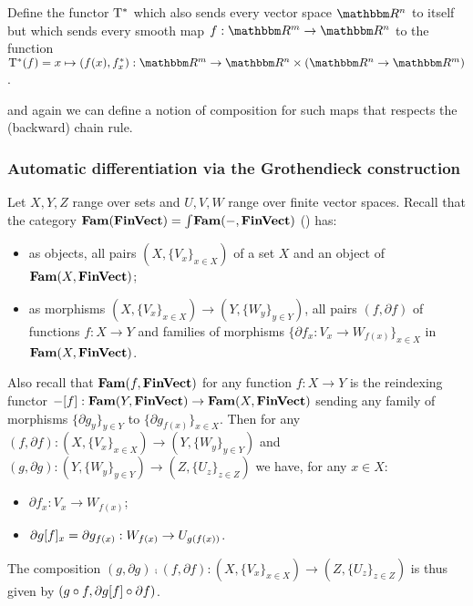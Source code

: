\begin{definition}
Define the functor $\mathrm{T}^*$ which also sends every vector space $\RR^n$ to itself but which sends every
smooth map $f: \RR^m \to \RR^n$ to the function $\tangents^*(f) = x \mapsto (f(x), \pullf{f}_x): \RR^m \to
\RR^n \times (\RR^n \to \RR^m)$.
\end{definition}

\noindent and again we can define a notion of composition for such maps that respects the (backward) chain
rule.

\subsubsection{Automatic differentiation via the Grothendieck construction}

Let $X, Y, Z$ range over sets and $U, V, W$ range over finite vector spaces. Recall that the category
$\mathbf{Fam}(\mathbf{FinVect}) = \int_{}\mathbf{Fam}(-, \mathbf{FinVect})$ () has:
\begin{itemize}
\item as objects, all pairs $(X, \{V_x\}_{x \in X})$ of a set $X$ and an object of $\mathbf{Fam}(X,\mathbf{FinVect})$;
\item as morphisms $(X, \{V_x\}_{x \in X}) \to (Y, \{W_y\}_{y \in Y})$, all pairs $(f, \partial f)$ of
functions $f: X \to Y$ and families of morphisms $\{\partial f_x: V_x \to W_{f(x)}\}_{x \in X}$
in $\mathbf{Fam}(X,\mathbf{FinVect})$.
\end{itemize}

Also recall that $\mathbf{Fam}(f, \mathbf{FinVect})$ for any function $f: X \to Y$ is the reindexing functor $-[f]:
\mathbf{Fam}(Y, \mathbf{FinVect}) \to \mathbf{Fam}(X, \mathbf{FinVect})$ sending any family of morphisms $\{\partial g_y\}_{y \in Y}$ to
$\{\partial g_{f(x)}\}_{x \in X}$. Then for any $(f, \partial f): (X, \{V_x\}_{x \in X}) \to (Y, \{W_y\}_{y
\in Y})$ and $(g, \partial g): (Y, \{W_y\}_{y \in Y}) \to (Z, \{U_z\}_{z \in Z})$ we have, for any $x \in X$:
\begin{itemize}
\item $\partial f_x: V_x \to W_{f(x)}$;
\item $\partial g[f]_x = \partial g_{f(x)}: W_{f(x)} \to U_{g(f(x))}$.
\end{itemize}

\noindent The composition $(g, \partial g) \comp (f, \partial f): (X, \{V_x\}_{x \in X}) \to (Z, \{U_z\}_{z
\in Z})$ is thus given by $(g \circ f, \partial g[f] \circ \partial f)$.
